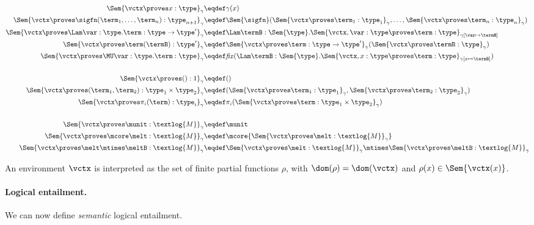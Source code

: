 \begin{align*}
	\Sem{\vctx \proves x : \type}_\gamma &\eqdef \gamma(x) \\
	\Sem{\vctx \proves \sigfn(\term_1, \dots, \term_n) : \type_{n+1}}_\gamma &\eqdef \Sem{\sigfn}(\Sem{\vctx \proves \term_1 : \type_1}_\gamma, \dots, \Sem{\vctx \proves \term_n : \type_n}_\gamma) \\
	\Sem{\vctx \proves \Lam \var:\type. \term : \type \to \type'}_\gamma &\eqdef
	\Lam \termB : \Sem{\type}. \Sem{\vctx, \var : \type \proves \term : \type}_{\gamma[\var \mapsto \termB]} \\
	\Sem{\vctx \proves \term(\termB) : \type'}_\gamma &\eqdef
	\Sem{\vctx \proves \term : \type \to \type'}_\gamma(\Sem{\vctx \proves \termB : \type}_\gamma) \\
	\Sem{\vctx \proves \MU \var:\type. \term : \type}_\gamma &\eqdef
	\mathit{fix}(\Lam \termB : \Sem{\type}. \Sem{\vctx, x : \type \proves \term : \type}_{\gamma[x \mapsto \termB]}) \\
  ~\\
	\Sem{\vctx \proves () : 1}_\gamma &\eqdef () \\
	\Sem{\vctx \proves (\term_1, \term_2) : \type_1 \times \type_2}_\gamma &\eqdef (\Sem{\vctx \proves \term_1 : \type_1}_\gamma, \Sem{\vctx \proves \term_2 : \type_2}_\gamma) \\
	\Sem{\vctx \proves \pi_i(\term) : \type_i}_\gamma &\eqdef \pi_i(\Sem{\vctx \proves \term : \type_1 \times \type_2}_\gamma) \\
  ~\\
	\Sem{\vctx \proves \munit : \textlog{M}}_\gamma &\eqdef \munit \\
	\Sem{\vctx \proves \mcore\melt : \textlog{M}}_\gamma &\eqdef \mcore{\Sem{\vctx \proves \melt : \textlog{M}}_\gamma} \\
	\Sem{\vctx \proves \melt \mtimes \meltB : \textlog{M}}_\gamma &\eqdef
	\Sem{\vctx \proves \melt : \textlog{M}}_\gamma \mtimes \Sem{\vctx \proves \meltB : \textlog{M}}_\gamma
\end{align*}
%

An environment $\vctx$ is interpreted as the set of
finite partial functions $\rho$, with $\dom(\rho) = \dom(\vctx)$ and
$\rho(x)\in\Sem{\vctx(x)}$.

\paragraph{Logical entailment.}
We can now define \emph{semantic} logical entailment.

